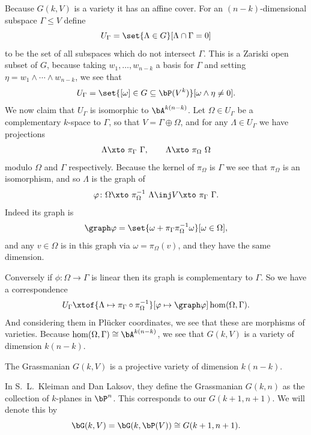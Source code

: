 \eexam

Because $G(k,V)$ is a variety it has an affine cover.
For an $(n-k)$-dimensional subspace $\Gamma\leq V$ define
$$ U_\Gamma = \set{\Lambda\in G}[\Lambda\cap\Gamma=0] $$
to be the set of all subspaces which do not intersect $\Gamma$.
This is a Zariski open subset of $G$, because taking $w_1,\dots,w_{n-k}$ a basis for $\Gamma$ and
setting $\eta=w_1\wedge\cdots\wedge w_{n-k}$, we see that
$$ U_\Gamma = \set{[\omega]\in G\subseteq\bP(V^k)}[\omega\wedge\eta\neq0] . $$
We now claim that $U_\Gamma$ is isomorphic to $\bA^{k(n-k)}$.
Let $\Omega\in U_\Gamma$ be a complementary $k$-space to $\Gamma$, so that $V=\Gamma\oplus\Omega$,
and for any $\Lambda\in U_\Gamma$ we have projections
$$ \Lambda \xtos{\pi_\Gamma} \Gamma,\qquad \Lambda \xtos{\pi_\Omega} \Omega $$
modulo $\Omega$ and $\Gamma$ respectively.
Because the kernel of $\pi_\Omega$ is $\Gamma$ we see that $\pi_\Omega$ is an isomorphism, and so
$\Lambda$ is the graph of
$$ \phi \colon \Omega \xtos{\pi_\Omega^{-1}} \Lambda \inj V \xtos{\pi_\Gamma} \Gamma . $$
Indeed its graph is
$$ \graph\phi = \set{\omega+\pi_\Gamma\pi_\Omega^{-1}\omega}[\omega\in\Omega] , $$
and any $v\in\Omega$ is in this graph via $\omega=\pi_\Omega(v)$, and they have the same dimension.

Conversely if $\phi\colon\Omega\to\Gamma$ is linear then its graph is complementary to $\Gamma$.
So we have a correspondence
$$ U_\Gamma \xtof{\Lambda\mapsto\pi_\Gamma\circ\pi_\Omega^{-1}}[\phi\mapsto\graph\phi] \hom(\Omega,\Gamma) . $$
And considering them in Pl\"ucker coordinates, we see that these are morphisms of varieties.
Because $\hom(\Omega,\Gamma)\cong\bA^{k(n-k)}$, we see that $G(k,V)$ is a variety of dimension $k(n-k)$.

\bprop

    The Grassmanian $G(k,V)$ is a projective variety of dimension $k(n-k)$.

\eprop

\bnote

    In S.\ L.\ Kleiman and Dan Laksov, they define the Grassmanian $G(k,n)$ as the collection of $k$-planes in
    $\bP^n$.
    This corresponds to our $G(k+1,n+1)$.
    We will denote this by
    $$ \bG(k,V) = \bG(k,\bP(V)) \cong G(k+1,n+1) . $$

\enote



